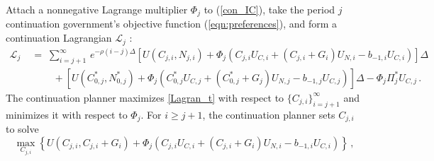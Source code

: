 \documentclass[12pt]{article}
\DeclareMathOperator*{\argmax}{arg\,max}
\newcommand{\NW}[1]{{\textcolor{blue}{#1}}}
\begin{document}
Attach a  nonnegative  Lagrange multiplier $\Phi_j $ to (\ref{con_IC}), take the period $j$ continuation government's objective  function (\ref{eqn:preferences}),
and  form  a continuation Lagrangian $\mathcal L_j$ : %
\begin{align}%
{\mathcal L}_j\; & =\;
\sum_{i=j+1}^{\infty} \, e^{-\rho(i-j) \Delta} \left[ U(C_{j, i}, N_{j, i}) + \Phi_j  \left (C_{j, i}U_{C, i} + (C_{j, i}+G_{i})U_{N, i} -b_{-1, i} U_{C, i} \right) \right]\Delta \nonumber\\
& \quad\quad\,  + \left[ U(C_{0, j}^*, N_{0, j}^*) + \Phi_j  \left (C_{0, j}^*U_{C, j} + (C_{0, j}^*+G_{j})U_{N, j} - b_{-1,j} U_{C, j} \right) \right]\Delta -\Phi_j \Pi_{{j}}^*U_{C, j} \, .\label{Lagran_t}
\end{align}
The continuation planner maximizes \eqref{Lagran_t}
with respect to $\{C_{j, i}\}_{i=j+1}^\infty$ and minimizes it with respect to $\Phi_j$.
For $i\geq j+1$, the continuation planner sets $C_{j,i}$ to solve %
\begin{equation}\label{consum_t}
\max_{C_{j,i}} \left\{ U(C_{j, i}, C_{j, i} + G_i)  +\Phi_j \left (C_{j, i}U_{C, i} + (C_{j, i}+G_{i})U_{N, i} -b_{-1, i}U_{C, i}\right)  \right\} \, , 
\end{equation} %
\end{document}
